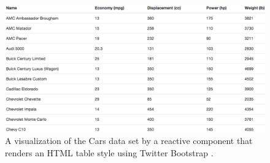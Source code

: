 \begin{figure}
  \centering
  \includegraphics[width=\figureWidth]{figs/table.png}
  \caption [Reactive Table Visualization]{A visualization of the Cars data set \cite{hauser2002angular} by a reactive component that renders an HTML table style using Twitter Bootstrap \cite{lerner2012forge}.}
  \label{fig:table}
\end{figure}

